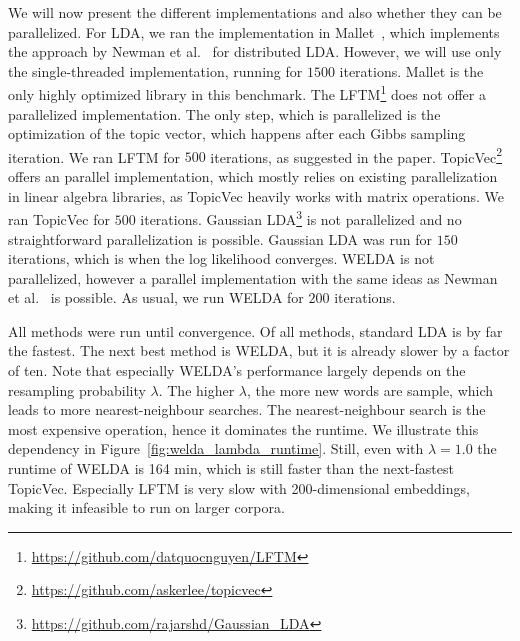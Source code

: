 \documentclass[
        a4paper,
        titlepage,
        twoside,
        parskip,
        numbers=noenddot
        ]{scrbook}
\theoremstyle{break}
\begin{document}
We will now present the different implementations and also whether they can be parallelized.
For LDA, we ran the implementation in Mallet~\cite{McCallum2002}, which implements the approach by Newman et al.~\cite{Newman2009} for distributed LDA.
However, we will use only the single-threaded implementation, running for $1500$ iterations.
Mallet is the only highly optimized library in this benchmark.
The LFTM\footnote{\url{https://github.com/datquocnguyen/LFTM}} does not offer a parallelized implementation.
The only step, which is parallelized is the optimization of the topic vector, which happens after each Gibbs sampling iteration.
We ran LFTM for $500$ iterations, as suggested in the paper.
TopicVec\footnote{\url{https://github.com/askerlee/topicvec}} offers an parallel implementation, which mostly relies on existing parallelization in linear algebra libraries, as TopicVec heavily works with matrix operations.
We ran TopicVec for $500$ iterations.
Gaussian LDA\footnote{\url{https://github.com/rajarshd/Gaussian_LDA}} is not parallelized and no straightforward parallelization is possible.
Gaussian LDA was run for $150$ iterations,  which is when the log likelihood converges.
WELDA is not parallelized, however a parallel implementation with the same ideas as Newman et al.~\cite{Newman2009} is possible.
As usual, we run WELDA for $200$ iterations.

All methods were run until convergence.
Of all methods, standard LDA is by far the fastest.
The next best method is WELDA, but it is already slower by a factor of ten.
Note that especially WELDA's performance largely depends on the resampling probability $\lambda$.
The higher $\lambda$, the more new words are sample, which leads to more nearest-neighbour searches.
The nearest-neighbour search is the most expensive operation, hence it dominates the runtime.
We illustrate this dependency in Figure~\ref{fig:welda_lambda_runtime}.
Still, even with $\lambda = 1.0$ the runtime of WELDA is 164 min, which is still faster than the next-fastest TopicVec.
Especially LFTM is very slow with 200-dimensional embeddings, making it infeasible to run on larger corpora.
\end{document}
